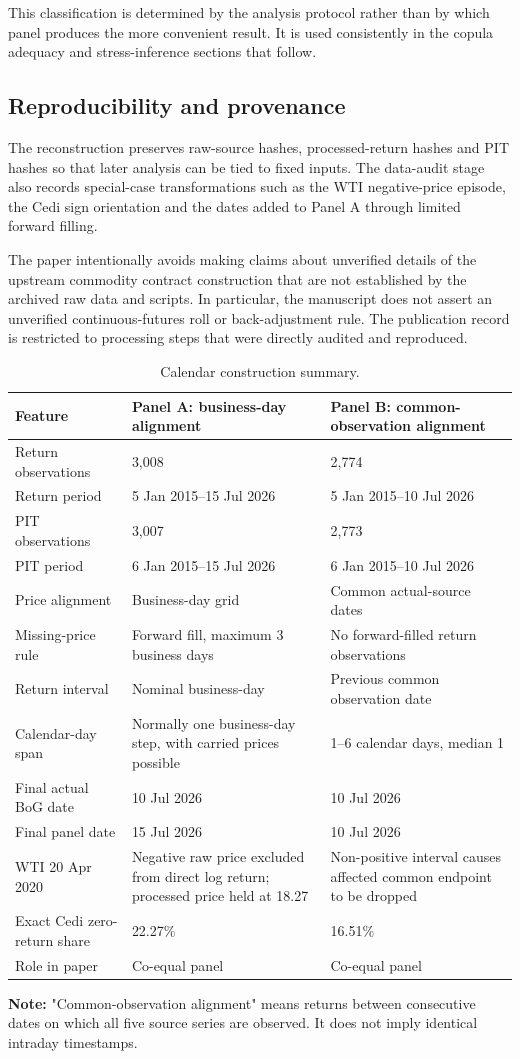 This classification is determined by the analysis protocol rather than by which panel produces the more convenient result. It is used consistently in the copula adequacy and stress-inference sections that follow.

\subsection{Reproducibility and provenance}

The reconstruction preserves raw-source hashes, processed-return hashes and PIT hashes so that later analysis can be tied to fixed inputs. The data-audit stage also records special-case transformations such as the WTI negative-price episode, the Cedi sign orientation and the dates added to Panel A through limited forward filling.

The paper intentionally avoids making claims about unverified details of the upstream commodity contract construction that are not established by the archived raw data and scripts. In particular, the manuscript does not assert an unverified continuous-futures roll or back-adjustment rule. The publication record is restricted to processing steps that were directly audited and reproduced.

\begin{table}[htbp]
\centering
\caption{Calendar construction summary.}
\label{tab:calendar-summary}
\small
\begin{tabularx}{\textwidth}{lXX}
\toprule
\textbf{Feature} & \textbf{Panel A: business-day alignment} & \textbf{Panel B: common-observation alignment} \\
\midrule
Return observations & 3,008 & 2,774 \\
Return period & 5 Jan 2015--15 Jul 2026 & 5 Jan 2015--10 Jul 2026 \\
PIT observations & 3,007 & 2,773 \\
PIT period & 6 Jan 2015--15 Jul 2026 & 6 Jan 2015--10 Jul 2026 \\
Price alignment & Business-day grid & Common actual-source dates \\
Missing-price rule & Forward fill, maximum 3 business days & No forward-filled return observations \\
Return interval & Nominal business-day & Previous common observation date \\
Calendar-day span & Normally one business-day step, with carried prices possible & 1--6 calendar days, median 1 \\
Final actual BoG date & 10 Jul 2026 & 10 Jul 2026 \\
Final panel date & 15 Jul 2026 & 10 Jul 2026 \\
WTI 20 Apr 2020 & Negative raw price excluded from direct log return; processed price held at 18.27 & Non-positive interval causes affected common endpoint to be dropped \\
Exact Cedi zero-return share & 22.27\% & 16.51\% \\
Role in paper & Co-equal panel & Co-equal panel \\
\bottomrule
\end{tabularx}
\end{table}

\textbf{Note:} "Common-observation alignment" means returns between consecutive dates on which all five source series are observed. It does not imply identical intraday timestamps.
